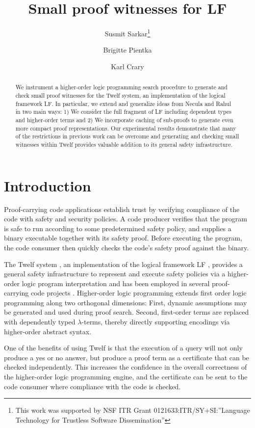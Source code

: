 \documentclass{llncs}
\title{Small proof witnesses for LF}
\author{
Susmit Sarkar\inst{1}\thanks{This work was supported by NSF ITR Grant 0121633:ITR/SY+SI:''Language Technology for Trustless Software Dissemination''}
\and Brigitte Pientka\inst{2}
\and Karl Crary\inst{1}}%
\institute{%
Carnegie Mellon University, Pittsburgh, USA
\and McGill University, Montr\'eal, Canada
}
\date{}
\begin{document}
\maketitle 
\begin{abstract}
We instrument a higher-order logic programming search procedure to
generate and check small proof witnesses for the Twelf system, an
implementation of the logical framework LF. In particular, we extend
and generalize ideas from Necula and Rahul~\cite{Necula+01:oracle} in
two main ways: 1) We consider the full fragment of LF including
dependent types and higher-order terms and 2) We incorporate caching
of sub-proofs to generate even more compact proof representations. Our
experimental results demonstrate that many of the restrictions in
previous work can be overcome and generating and checking small
witnesses within Twelf provides valuable addition to its general
safety infrastructure.
\end{abstract}

\section{Introduction}
Proof-carrying code applications establish trust by verifying
compliance of the code with safety and security policies.
A code producer verifies that the program is safe to
run according to some predetermined safety policy, and supplies a
binary executable together with its safety proof. Before
executing the program, the code consumer then quickly checks the code's
safety proof against the binary. 

The Twelf system \cite{Pfenning99cade}, an implementation of the logical framework LF \cite{Harper93jacm}, provides a general safety
infrastructure to represent and execute safety policies via a
higher-order logic program interpretation and has been employed in
several proof-carrying code projects
\cite{AppelFelty00,Crary:POPL03,AppelFelten99,Crary:CADE03}.   
Higher-order logic programming extends first order logic
programming along two orthogonal dimensions: First, dynamic assumptions
may be generated and used during proof search. Second, first-order terms
are replaced with dependently typed $\lambda$-terms, thereby
directly supporting encodings via higher-order abstract
syntax. 

One of the benefits of using Twelf is that the
execution of a query will not only produce a yes or no answer, but
produce a proof term as a certificate that can be checked independently. 
This increases the confidence in the overall correctness of the
higher-order logic programming engine, and the certificate can
be sent to the code consumer where compliance with the code is
checked. 
\end{document}
